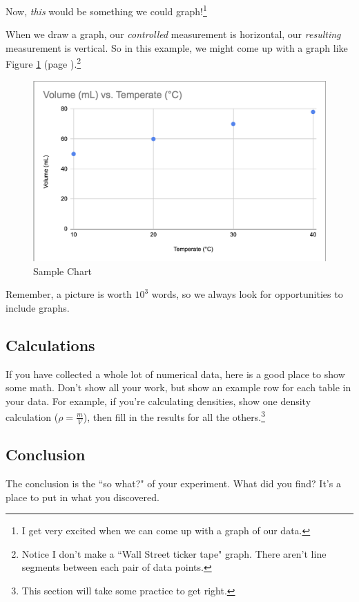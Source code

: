 \documentclass[12pt, oneside]{article}   	%
\begin{document}
Now, \emph{this} would be something we could graph!\footnote{I get very excited when we can come up with a graph of our data.}

When we draw a graph, our \emph{controlled} measurement is horizontal, our \emph{resulting} measurement is vertical.
So in this example, we might come up with a graph like Figure \ref{figure:sampleChart} (page  \pageref{figure:sampleChart}).\footnote{Notice I don't make a ``Wall Street ticker tape" graph. There aren't line segments between each pair of data points.}

\begin{figure}[p]
\includegraphics[scale=0.75]{Sample_Chem_Chart.png}
 \caption{Sample Chart}
 \label{figure:sampleChart}
 \end{figure}  

Remember, a picture is worth $10^3$ words, so we always look for opportunities to include graphs.


\subsection{Calculations}
If you have collected a whole lot of numerical data, here is a good place to show some math. Don't show all your work, but show an example row for each table in your data. For example, if you're calculating densities, show one density calculation ($\rho = \frac{m}{V}$), then fill in the results for all the others.\footnote{This section will take some practice to get right.}

\subsection{Conclusion}
The conclusion is the ``so what?" of your experiment. What did you find? It's a place to put in what you discovered.
\end{document}
